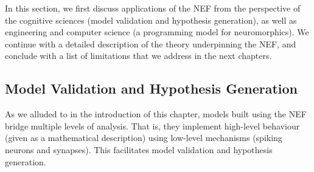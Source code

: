 
In this section, we first discuss applications of the NEF from the perspective of the cognitive sciences (model validation and hypothesis generation), as well as engineering and computer science (a programming model for neuromorphics).
We continue with a detailed description of the theory underpinning the NEF, and conclude with a list of limitations that we address in the next chapters.

\subsection{Model Validation and Hypothesis Generation}
\label{sec:nef_purpose}

As we alluded to in the introduction of this chapter, models built using the NEF bridge multiple levels of analysis.
That is, they implement high-level behaviour (given as a mathematical description) using low-level mechanisms (spiking neurons and synapses).
This facilitates model validation and hypothesis generation.

